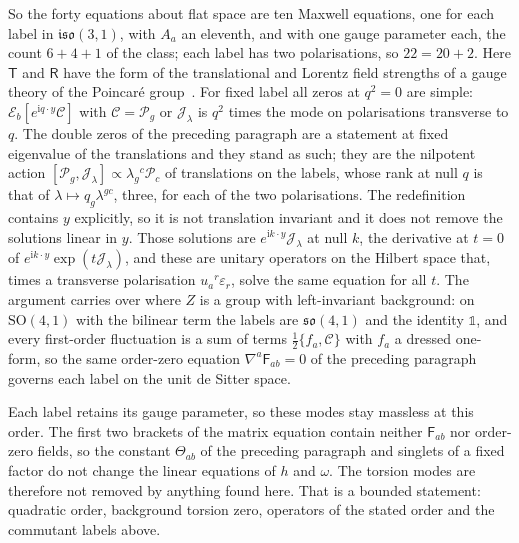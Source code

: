 So the forty equations about flat space are ten Maxwell equations, one for each label in \(\mathfrak{iso}(3,1)\), with \(A_a\) an eleventh, and with one gauge parameter each, the count \(6+4+1\) of the class; each label has two polarisations, so \(22=20+2\). Here \(\mathsf T\) and \(\mathsf R\) have the form of the translational and Lorentz field strengths of a gauge theory of the Poincar\'e group~\cite{Kibble1961,Hehl2017}. For fixed label all zeros at \(q^2=0\) are simple: \(\mathcal E_b[e^{\mathrm iq\cdot y}\mathcal C]\) with \(\mathcal C=\mathcal P_g\) or \(\mathcal J_\lambda\) is \(q^2\) times the mode on polarisations transverse to \(q\). The double zeros of the preceding paragraph are a statement at fixed eigenvalue of the translations and they stand as such; they are the nilpotent action \([\mathcal P_g,\mathcal J_\lambda]\propto\lambda_g{}^c\mathcal P_c\) of translations on the labels, whose rank at null \(q\) is that of \(\lambda\mapsto q_g\lambda^{gc}\), three, for each of the two polarisations. The redefinition contains \(y\) explicitly, so it is not translation invariant and it does not remove the solutions linear in \(y\). Those solutions are \(e^{\mathrm ik\cdot y}\mathcal J_\lambda\) at null \(k\), the derivative at \(t=0\) of \(e^{\mathrm ik\cdot y}\exp(t\mathcal J_\lambda)\), and these are unitary operators on the Hilbert space that, times a transverse polarisation \(u_a{}^r\varepsilon_r\), solve the same equation for all \(t\). The argument carries over where \(Z\) is a group with left-invariant background: on \(\mathrm{SO}(4,1)\) with the bilinear term the labels are \(\mathfrak{so}(4,1)\) and the identity \(\mathbb 1\), and every first-order fluctuation is a sum of terms \(\tfrac12\{f_a,\mathcal C\}\) with \(f_a\) a dressed one-form, so the same order-zero equation \(\nabla^a\mathsf F_{ab}=0\) of the preceding paragraph governs each label on the unit de Sitter space.

Each label retains its gauge parameter, so these modes stay massless at this order. The first two brackets of the matrix equation contain neither \(\mathsf F_{ab}\) nor order-zero fields, so the constant \(\Theta_{ab}\) of the preceding paragraph and singlets of a fixed factor do not change the linear equations of \(h\) and \(\omega\). The torsion modes are therefore not removed by anything found here. That is a bounded statement: quadratic order, background torsion zero, operators of the stated order and the commutant labels above.

